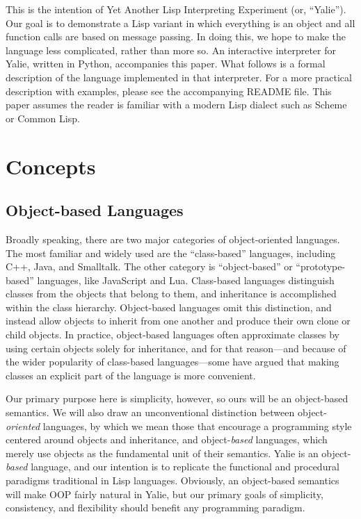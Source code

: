 \documentclass[twocolumn]{article}
\begin{document}
This is the intention of Yet Another Lisp Interpreting Experiment (or,
``Yalie''). Our goal is to demonstrate a Lisp variant in which
everything is an object and all function calls are based on message
passing. In doing this, we hope to make the language less complicated,
rather than more so. An interactive interpreter for Yalie, written in
Python, accompanies this paper. What follows is a formal description
of the language implemented in that interpreter.  For a more practical
description with examples, please see the accompanying README
file. This paper assumes the reader is familiar with a modern Lisp
dialect such as Scheme or Common Lisp.

\section*{Concepts}
\subsection*{Object-based Languages}
Broadly speaking, there are two major categories of object-oriented
languages\cite{Abadi}. The most familiar and widely used are the
``class-based'' languages, including C++, Java, and Smalltalk. The
other category is ``object-based'' or ``prototype-based'' languages,
like JavaScript and Lua. Class-based languages distinguish classes
from the objects that belong to them, and inheritance is accomplished
within the class hierarchy. Object-based languages omit this
distinction, and instead allow objects to inherit from one another and
produce their own clone or child objects. In practice, object-based
languages often approximate classes by using certain objects solely
for inheritance, and for that reason---and because of the wider
popularity of class-based languages---some have argued that making
classes an explicit part of the language is more
convenient\cite{Bruce}.

Our primary purpose here is simplicity, however, so ours will be an
object-based semantics. We will also draw an unconventional
distinction between object-\emph{oriented} languages, by which we mean
those that encourage a programming style centered around objects and
inheritance, and object-\emph{based} languages, which merely use
objects as the fundamental unit of their semantics. Yalie is an
object-\emph{based} language, and our intention is to replicate the
functional and procedural paradigms traditional in Lisp
languages. Obviously, an object-based semantics will make OOP fairly
natural in Yalie, but our primary goals of simplicity, consistency,
and flexibility should benefit any programming paradigm.
\end{document}
